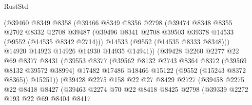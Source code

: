 \begin{lexlean}{RustStd}
\begin{coremodule}
                        (@39460
                          @8349
                          @8358
                          (@39466
                            @8349
                            @8356
                            @2798
                            (@39474
                              @8348
                              @8355
                              @2702
                              @8332
                              @2708
                              @39487
                              (@39496 @8341 @2708 @39503 @39378 @14533 (@9552 (@14535 @8342 @2714)))
                              @14533
                              (@9552 (@14535 @8333 @8348)))
                            @14920
                            @14923
                            @14926
                            @14930
                            @14935
                            @14941))
                        (@39428
                          @2260
                          @2277
                          @22
                          @69
                          @8377
                          @8431
                          (@39553
                            @8377
                            (@39562
                              @8132
                              @2743
                              @8364
                              @8372
                              (@39569 @8132 @39572 @38994)
                              @17482
                              @17486
                              @18466
                              @15122
                              (@9552 (@15243 @8372 @8365))
                              @15251))
                          (@39428
                            @2275
                            @158
                            @22
                            @27
                            @8429
                            @2727
                            (@39458
                              @2275
                              @22
                              @8418
                              @8427
                              (@39463
                                @2274
                                @70
                                @22
                                @8418
                                @8425
                                @2798
                                (@39339
                                  @2272
                                  @193
                                  @22
                                  @69
                                  @8404
                                  @8417

\end{coremodule}
\end{lexlean}
